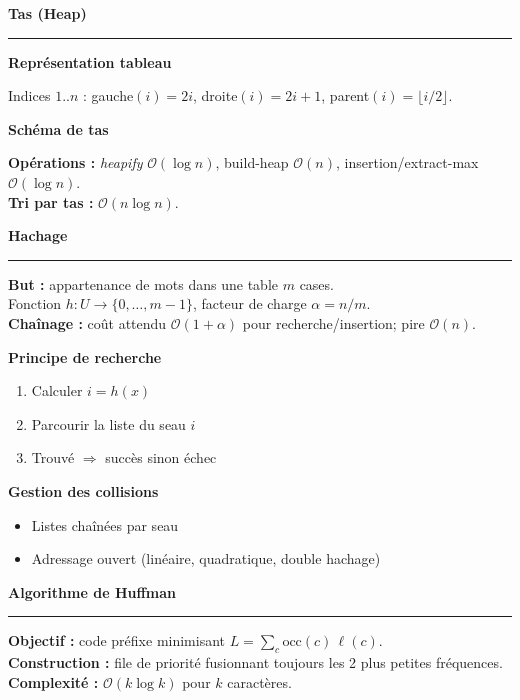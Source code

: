 \documentclass[9pt,a4paper]{article}
\newcommand{\bigO}{\mathcal{O}}
\newcommand{\sect}[1]{\vspace{1ex}\textbf{\large #1}\par\vspace{0.3ex}\hrule\vspace{0.6ex}}
\newcommand{\subsect}[1]{\vspace{0.4ex}\textbf{#1}\par}
\begin{document}
\begin{multicols}{3}
    \sect{Tas (Heap)}
    \subsect{Représentation tableau}
    Indices $1..n$ : gauche$(i)=2i$, droite$(i)=2i+1$, parent$(i)=\lfloor i/2\rfloor$.

    \subsect{Schéma de tas}
    \begin{center}
    \end{center}

    \textbf{Opérations :} \emph{heapify} $\bigO(\log n)$,
    build-heap $\bigO(n)$, insertion/extract-max $\bigO(\log n)$.\\
    \textbf{Tri par tas :} $\bigO(n\log n)$.

    \sect{Hachage}
    \textbf{But :} appartenance de mots dans une table $m$ cases.\\
    Fonction $h:U\to\{0,\dots,m-1\}$, facteur de charge $\alpha=n/m$.\\
    \textbf{Chaînage :} coût attendu $\bigO(1+\alpha)$ pour recherche/insertion; pire $\bigO(n)$.

    \subsect{Principe de recherche}
    \begin{enumerate}
        \item Calculer $i=h(x)$
        \item Parcourir la liste du seau $i$
        \item Trouvé $\Rightarrow$ succès sinon échec
    \end{enumerate}

    \subsect{Gestion des collisions}
    \begin{itemize}
        \item Listes chaînées par seau
        \item Adressage ouvert (linéaire, quadratique, double hachage)
    \end{itemize}

    \sect{Algorithme de Huffman}
    \textbf{Objectif :} code préfixe minimisant $L=\sum_c \mathrm{occ}(c)\,\ell(c)$. \\
    \textbf{Construction :} file de priorité fusionnant toujours les 2 plus petites fréquences.\\
    \textbf{Complexité :} $\bigO(k\log k)$ pour $k$ caractères.


\end{multicols}
\end{document}
